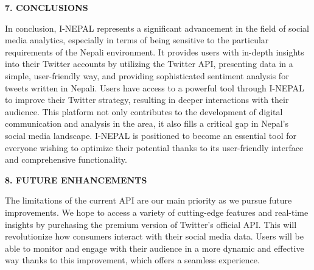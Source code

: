 \documentclass[a4paper,12pt]{article}
\begin{document}
{{{ %
		\newpage
				
		\begin{flushleft}
			\fontsize{14}{16}\selectfont\textbf{7. CONCLUSIONS}
			\label{conclusion}
		\end{flushleft}
				
	In conclusion, I-NEPAL represents a significant advancement in the field of social media analytics, especially in terms of being sensitive to the particular requirements of the Nepali environment. It provides users with in-depth insights into their Twitter accounts by utilizing the Twitter API, presenting data in a simple, user-friendly way, and providing sophisticated sentiment analysis for tweets written in Nepali. Users have access to a powerful tool through I-NEPAL to improve their Twitter strategy, resulting in deeper interactions with their audience. This platform not only contributes to the development of digital communication and analysis in the area, it also fills a critical gap in Nepal's social media landscape. I-NEPAL is positioned to become an essential tool for everyone wishing to optimize their potential thanks to its user-friendly interface and comprehensive functionality.
				
		
		            








   
   



		\newpage
				
		\begin{flushleft}
			\fontsize{14}{16}\selectfont\textbf{8. FUTURE ENHANCEMENTS}
			\phantomsection
			\label{future}
		\end{flushleft}

The limitations of the current API are our main priority as we pursue future improvements. We hope to access a variety of cutting-edge features and real-time insights by purchasing the premium version of Twitter's official API. This will revolutionize how consumers interact with their social media data. Users will be able to monitor and engage with their audience in a more dynamic and effective way thanks to this improvement, which offers a seamless experience.

}}}
\end{document}
